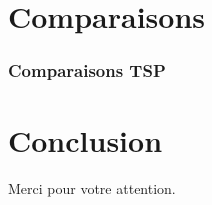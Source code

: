 \documentclass[french]{beamer}
\begin{document}
\section{Comparaisons}

\begin{frame}
  \frametitle{Comparaisons TSP}
  
\end{frame}

\section{Conclusion}
\begin{frame}

\end{frame}


\begin{frame}
  \begin{center}
    Merci pour votre attention.
  \end{center}
\end{frame}
\end{document}
